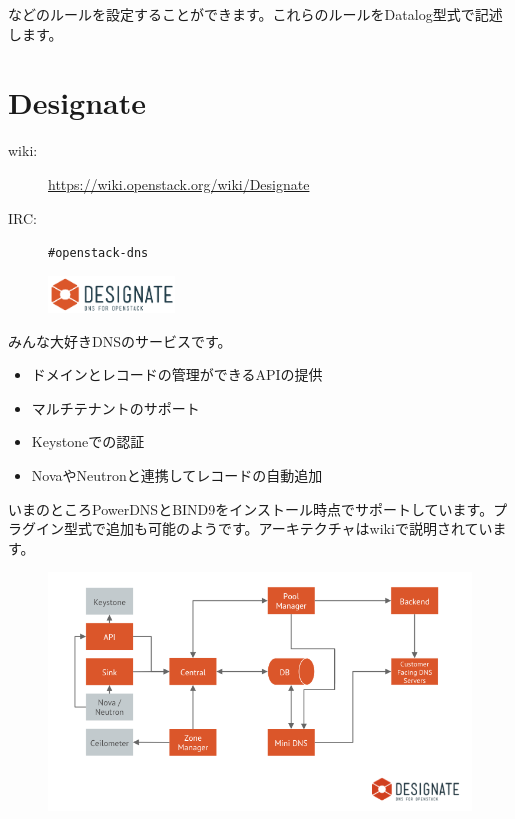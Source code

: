 などのルールを設定することができます。これらのルールをDatalog型式で記述します。

\section{Designate}

\begin{description}
	\item[wiki:] \url{https://wiki.openstack.org/wiki/Designate}
	\item[IRC:] \verb|#openstack-dns|
\end{description}

\begin{figure}
	\begin{center}
		\includegraphics[width=0.3\textwidth]{img/logo-designate.pdf}
	\end{center}
\end{figure}

みんな大好きDNSのサービスです。

\begin{itemize}
	\item ドメインとレコードの管理ができるAPIの提供
	\item マルチテナントのサポート
	\item Keystoneでの認証
	\item NovaやNeutronと連携してレコードの自動追加
\end{itemize}

いまのところPowerDNSとBIND9をインストール時点でサポートしています。プラグイン型式で追加も可能のようです。アーキテクチャはwikiで説明されています。

\begin{figure}[htb]
	\begin{center}
		\includegraphics[width=\textwidth]{img/Designate-Arch.png}
	\end{center}
\end{figure}

